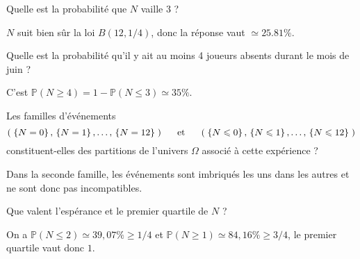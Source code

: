\begin{question}
Quelle est la probabilité que $N$ vaille 3 ?
\begin{answers}
\end{answers}
\begin{explanations}
$N$ suit bien sûr la loi $B(12,1/4)$, donc la réponse vaut $\simeq 25.81\%$. 
\end{explanations}
\end{question}


\begin{question}
Quelle est la probabilité qu'il y ait au moins 4 joueurs absents durant le mois de juin ?
\begin{answers}
\end{answers}
\begin{explanations}
C'est $\mathbb{P}(N\geq 4)=1-\mathbb{P}(N\leq 3)\simeq 35\%$.
\end{explanations}
\end{question}


\begin{question}
Les familles d'événements 
$$
( \; \{N=0\}\, , \, \{N=1\}\, , \ldots , \, \{N=12\} \; ) \makebox[1.5cm][c]{ et } 
( \;\{N\leq 0\}\, , \, \{N\leq 1\}\, , \ldots , \, \{N\leq 12\}\; )
$$ 
constituent-elles des partitions de l'univers $\Omega$ associé à cette expérience ?
\begin{answers}
\end{answers}
\begin{explanations}
Dans la seconde famille, les événements sont imbriqués les uns dans les autres et ne sont donc pas incompatibles.
\end{explanations}
\end{question}


\begin{question}
Que valent l'espérance et le premier quartile de $N$ ? 
\begin{answers}
\end{answers}
\begin{explanations}
On a $\mathbb{P}(N\leq 2) \simeq 39,07\% \geq 1/4$ et $\mathbb{P}(N\geq 1) \simeq  84,16\% \geq 3/4$, le premier quartile vaut donc $1$.
\end{explanations}
\end{question}




